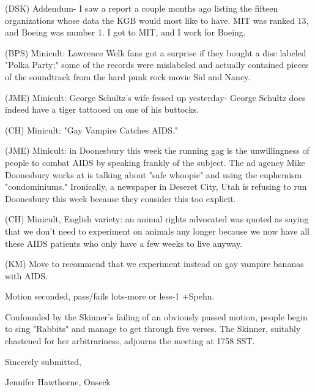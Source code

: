 \documentclass[12pt]{article}
\begin{document}
(DSK) Addendum- I saw a report a couple months ago listing the fifteen organizations whose data the KGB would most like to have. MIT was ranked 13, and Boeing was number 1. I got to MIT, and I work for Boeing.

(BPS) Minicult: Lawrence Welk fans got a surprise if they bought a disc labeled "Polka Party;" some of the records were mislabeled and actually contained pieces of the soundtrack from the hard punk rock movie Sid and Nancy.

(JME) Minicult: George Schultz's wife fessed up yesterday- George Schultz does indeed have a tiger tattooed on one of his buttocks.

(CH) Minicult: "Gay Vampire Catches AIDS."

(JME) Minicult: in Doonesbury this week the running gag is the unwillingness of people to combat AIDS by speaking frankly of the subject. The ad agency Mike Doonesbury works at is talking about "safe whoopie" and using the euphemism "condominiums." Ironically, a newspaper in Deseret City, Utah is refusing to run Doonesbury this week because they consider this too explicit.

(CH) Minicult, English variety: an animal rights advocated was quoted as saying that we don't need to experiment on animals any longer because we now have all these AIDS patients who only have a few weeks to live anyway.

(KM) Move to recommend that we experiment instead on gay vampire bananas with AIDS.

Motion seconded, pass/fails lots-more or less-1 +Spehn.

Confounded by the Skinner's failing of an obviously passed motion, people begin to sing "Rabbits" and manage to get through five verses. The Skinner, suitably chastened for her arbitrariness, adjourns the meeting at 1758 SST.

\vspace{18pt}

\centerline{Sincerely submitted,}
\centerline{Jennifer Hawthorne, Onseck}
\end{document}
